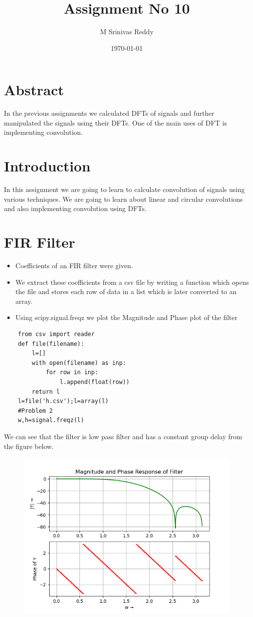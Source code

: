 \documentclass[11pt, a4paper]{article}
\title{Assignment No 10} %
\author{M Srinivas Reddy} %
\date{\today} %
\begin{document}
\maketitle
\section{Abstract}
In the previous assignments we calculated DFTs of signals and further manipulated the signals using their DFTs. One of the main uses of DFT is implementing convolution.
\section{Introduction}
In this assignment we are going to learn to calculate convolution of signals using various techniques. We are going to learn about linear and circular convolutions and also implementing convolution using DFTs.
\section{FIR Filter}
\begin{itemize}
    \item Coefficients of an FIR filter were given.
    \item  We extract these coefficients from a csv file by writing a function which opens the file and stores each row of data in a list which is later converted to an array.
    \item Using scipy.signal.freqz we plot the Magnitude and Phase plot of the filter
\end{itemize}
\begin{verbatim}
    from csv import reader
    def file(filename):
        l=[]
        with open(filename) as inp:
            for row in inp:
                l.append(float(row))
        return l
    l=file('h.csv');l=array(l)
    #Problem 2
    w,h=signal.freqz(l)
\end{verbatim}
We can see that the filter is low pass filter and has a constant group delay from the figure below.
\begin{figure}[H]
   	\centering
   	\includegraphics[scale=0.5]{Figure_1.png}
\end{figure}
\end{document}
